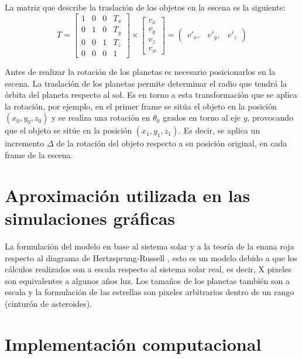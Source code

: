 \documentclass[journal]{IEEEtran}
\begin{document}
La matriz que describe la traslación de los objetos en la escena es la siguiente:\\

\[ 
	T = \left[ 
			\begin{array}{cccc}
				1 & 0 & 0 & T_{x} \\
				0 & 1 & 0 & T_{y} \\
				0 & 0 & 1 & T_{z} \\
				0 & 0 & 0 & 1 
			\end{array}
		\right] \times 
		\left[ 
			\begin{array}{c}
				v_{x} \\
				v_{y} \\
				v_{z} \\
				v_{w} 
			\end{array}
		\right] = 
		\left(
			\begin{array}{ccc}
				v'_{x} , & v'_{y} , & v'_{z}
			\end{array}
		\right)
\]

Antes de realizar la rotación de los planetas es necesario posicionarlos en la escena. La traslación de los planetas permite determinar el radio que tendrá la órbita del planeta respecto al sol. Es en torno a esta transformación que se aplica la rotación, por ejemplo, en el primer frame se sitúa el objeto en la posición $(x_{0}, y_{0}, z_{0})$ y se realiza una rotación en $\theta_{0}$ grados en torno al eje $y$, provocando que el objeto se sitúe en la posición $(x_{1}, y_{1}, z_{1})$. Es decir, se aplica un incremento $\Delta$ de la rotación del objeto respecto a su posición original, en cada frame de la escena.

\section{Aproximación utilizada en las simulaciones gráficas}

La formulación del modelo en base al sistema solar y a la teoría de la enana roja respecto al diagrama de Hertzsprung-Russell \cite{russel}, esto es un modelo debido a que los cálculos realizados son a escala respecto al sistema solar real, es decir, X pixeles son equivalentes a algunos años luz. Los tamaños de los planetas también son a escala y la formulación de las estrellas son pixeles arbitrarios dentro de un rango (cinturón de asteroides).

\section{Implementación computacional}
\end{document}
